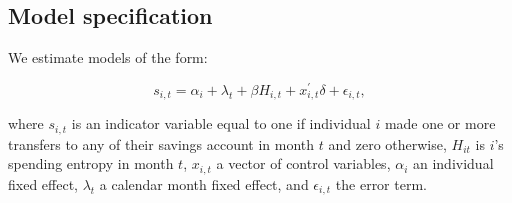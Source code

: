 \subsection{Model specification}%
\label{par:model_specification}

We estimate models of the form: 

\begin{equation}
    s_{i,t} = \alpha_i + \lambda_t + \beta H_{i,t} + x^\prime_{i,t} \delta +
    \epsilon_{i,t},
\end{equation}

where $s_{i,t}$ is an indicator variable equal to one if individual $i$ made
one or more transfers to any of their savings account in month $t$ and zero
otherwise, $H_{it}$ is $i$'s spending entropy in month $t$, $x_{i,t}$ a vector
of control variables, $\alpha_i$ an individual fixed effect, $\lambda_t$ a
calendar month fixed effect, and $\epsilon_{i, t}$ the error term.


